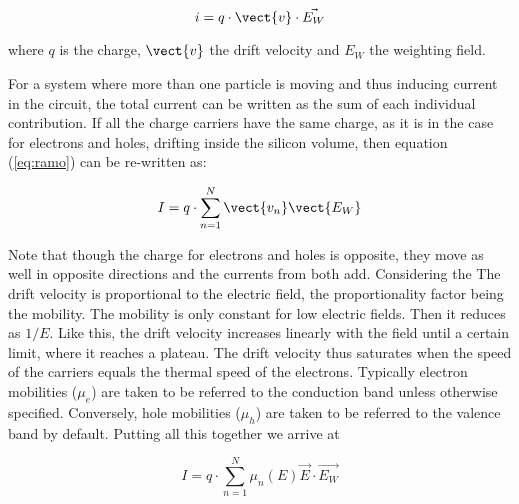 \begin{equation}
	i = q \cdot \vect{v} \cdot \vec{E_{W}}
	\label{eq:ramo} 
\end{equation} 

where $q$ is the charge, $\vect{v}$ the drift velocity and $E_{W}$ the weighting
field.

For a system where more than one particle is moving and thus inducing current in
the circuit, the total current can be written as the sum of each individual
contribution. If all the charge carriers have the same charge, as it is in the
case for electrons and holes, drifting inside the silicon volume, then equation
(\ref{eq:ramo}) can be re-written as:

\begin{equation}
	I = q \cdot \sum_{n=1}^{N} \vect{v_n}\vect{E_{W}} 	\label{eq:ramoTot} 
\end{equation} 

Note that though the charge for electrons and holes is opposite, they move as
well in opposite directions and the currents from both add. Considering the The
drift velocity is proportional to the electric field, the proportionality factor
being the mobility. The mobility is only constant for low electric fields. Then
it reduces as $1/E$. Like this, the drift velocity increases linearly with the
field until a certain limit, where it reaches a plateau. The drift velocity thus
saturates when the speed of the carriers equals the thermal speed of the
electrons. Typically electron mobilities ($ \mu_e $) are taken to be referred to
the conduction band unless otherwise specified. Conversely, hole mobilities ($
\mu_h $) are taken to be referred to the valence band by default. Putting all
this together we arrive at

\begin{equation}
	I = q \cdot \sum_{n=1}^{N} \mu_n(E) \vec{E} \cdot \vec{E_{W}} 
\label{eq:ramoMob}
\end{equation}

